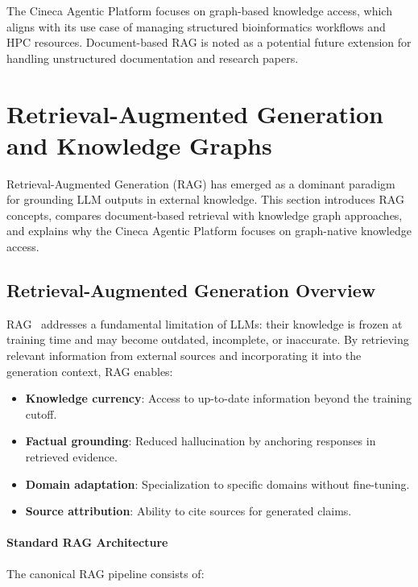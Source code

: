 \documentclass[a4paper,twoside]{sapthesis}
\begin{document}
The Cineca Agentic Platform focuses on graph-based knowledge access, which aligns with its use case of managing structured bioinformatics workflows and HPC resources. Document-based RAG is noted as a potential future extension for handling unstructured documentation and research papers.

\section{Retrieval-Augmented Generation and Knowledge Graphs}
\label{sec:rag-kg}

Retrieval-Augmented Generation (RAG) has emerged as a dominant paradigm for grounding LLM outputs in external knowledge. This section introduces RAG concepts, compares document-based retrieval with knowledge graph approaches, and explains why the Cineca Agentic Platform focuses on graph-native knowledge access.

\subsection{Retrieval-Augmented Generation Overview}

RAG~\cite{lewis2020rag}
addresses a fundamental limitation of LLMs: their knowledge is frozen at training time and may become outdated, incomplete, or inaccurate. By retrieving relevant information from external sources and incorporating it into the generation context, RAG enables:

\begin{itemize}
    \item \textbf{Knowledge currency}: Access to up-to-date information beyond the training cutoff.
    \item \textbf{Factual grounding}: Reduced hallucination by anchoring responses in retrieved evidence.
    \item \textbf{Domain adaptation}: Specialization to specific domains without fine-tuning.
    \item \textbf{Source attribution}: Ability to cite sources for generated claims.
\end{itemize}

\paragraph{Standard RAG Architecture}

The canonical RAG pipeline consists of:
\end{document}
